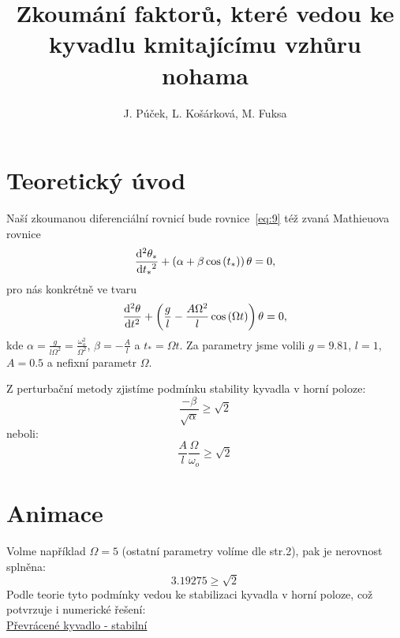 \documentclass{beamer}
\title[Převrácené kyvadlo]{Zkoumání faktorů, které vedou ke kyvadlu kmitajícímu vzhůru nohama}
\author[J. P., L. K., M. F.]{J. Púček, L. Košárková, M. Fuksa}
\institute[Univerzita Karlova]{Univerzita Karlova, Česká republika}
\date{}
\begin{document}
\begin{frame}
\titlepage
\end{frame}

\section{Teoretický úvod}
\label{sec:uvod}

\begin{frame}
\begin{center}
			Naší zkoumanou diferenciální rovnicí bude rovnice~\eqref{eq:9} též zvaná Mathieuova rovnice
		\begin{equation}
			\label{eq:9}
			\frac{\mathrm{d}^2 {\theta_{*}}}{\mathrm{d} {t_{*}}^2}
			+
			\left(
			\alpha
			+
			\beta \cos \left( t_{*} \right)
			\right)
			\theta
			=
			0
			,
		\end{equation}
			pro nás konkrétně ve tvaru
		\begin{equation}
			\label{eq:10}
			\frac{\mathrm{d}^2 {\theta}}{\mathrm{d} {t}^2}
			+
			\left(
			\frac{g}{l}
			-
			\frac{A \Omega^2}{l} \cos \left( \Omega t \right)
			\right)
			\theta
			=
			0
			,
		\end{equation}
			kde $\alpha=\frac{g}{l\Omega^2}=\frac{\omega_{o}^2}{\Omega^2}$, $ \beta=-\frac{A}{l}$ a $t_{*}=\Omega t$. Za parametry jsme volili $g=9.81$, $l=1$,  $A=0.5$ a nefixní parametr $\Omega$.
		\end{center}
\end{frame}

\begin{frame}
	\begin{center}
	Z perturbační metody zjistíme podmínku stability kyvadla v horní poloze: 
	\begin{equation*}
		\frac{-\beta}{\sqrt{\alpha}}\geq \sqrt{2}
	\end{equation*}
	neboli:
	\begin{equation*}
	\frac{A}{l}\frac{\Omega}{\omega_{o}}\geq \sqrt{2}
	\end{equation*}	
	\end{center}
\end{frame}

\section{Animace}
\label{sec:animace}

\begin{frame}
\begin{center}
	Volme například $\Omega=5$ (ostatní parametry volíme dle str.2), pak je nerovnost splněna:
\begin{equation*}
	3.19275 \geq \sqrt{2}
\end{equation*}	
	Podle teorie tyto podmínky vedou ke stabilizaci kyvadla v horní poloze, což potvrzuje i numerické řešení: 
\\

\href{run:./animace.mp4}{Převrácené kyvadlo - stabilní}
\end{center}
\end{frame}
\end{document}
